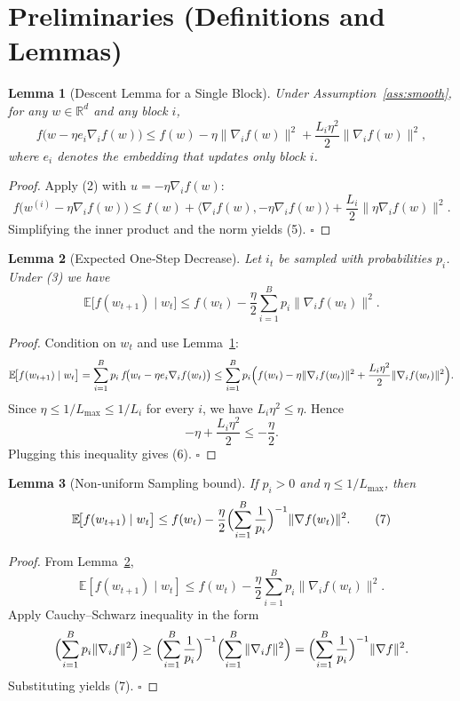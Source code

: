 \documentclass{article}
\newtheorem{lemma}{Lemma}
\begin{document}
\section*{Preliminaries (Definitions and Lemmas)}
\begin{lemma}[Descent Lemma for a Single Block]\label{lem:descent}
Under Assumption~\ref{ass:smooth}, for any $w\in\mathbb{R}^d$ and any block $i$,
\[
f\!\bigl(w - \eta e_i \nabla_i f(w)\bigr)
\le
f(w) - \eta \|\nabla_i f(w)\|^2 + \frac{L_i\eta^{2}}{2}\|\nabla_i f(w)\|^2,
\tag{5}
\]
where $e_i$ denotes the embedding that updates only block $i$.
\end{lemma}
\begin{proof}
Apply (2) with $u=-\eta\nabla_i f(w)$:
\[
f\bigl(w^{(i)}-\eta\nabla_i f(w)\bigr)
\le
f(w)+\langle \nabla_i f(w), -\eta\nabla_i f(w)\rangle
+\frac{L_i}{2}\|\eta\nabla_i f(w)\|^{2}.
\]
Simplifying the inner product and the norm yields (5). \hfill $\square$
\end{proof}

\begin{lemma}[Expected One‑Step Decrease]\label{lem:expdecrease}
Let $i_t$ be sampled with probabilities $p_i$. Under (3) we have
\[
\mathbb{E}\!\bigl[f(w_{t+1})\mid w_t\bigr]
\le
f(w_t)-\frac{\eta}{2}\sum_{i=1}^{B}p_i\|\nabla_i f(w_t)\|^{2}.
\tag{6}
\]
\end{lemma}
\begin{proof}
Condition on $w_t$ and use Lemma~\ref{lem:descent}:
\[
\mathbb{E}\!\bigl[f(w_{t+1})\mid w_t\bigr]
= \sum_{i=1}^{B}p_i\,f\!\bigl(w_t-\eta e_i\nabla_i f(w_t)\bigr)
\le
\sum_{i=1}^{B}p_i\Bigl(f(w_t)-\eta\|\nabla_i f(w_t)\|^{2}
+\frac{L_i\eta^{2}}{2}\|\nabla_i f(w_t)\|^{2}\Bigr).
\]
Since $\eta\le 1/L_{\max}\le 1/L_i$ for every $i$, we have $L_i\eta^{2}\le\eta$. Hence
\[
-\eta+\frac{L_i\eta^{2}}{2}\le -\frac{\eta}{2}.
\]
Plugging this inequality gives (6). \hfill $\square$
\end{proof}

\begin{lemma}[Non‑uniform Sampling bound]\label{lem:nonuniform}
If $p_i>0$ and $\eta\le 1/L_{\max}$, then
\[
\mathbb{E}\!\bigl[f(w_{t+1})\mid w_t\bigr]
\le
f(w_t)-\frac{\eta}{2}\Bigl(\sum_{i=1}^{B}\frac{1}{p_i}\Bigr)^{-1}\|\nabla f(w_t)\|^{2}.
\tag{7}
\]
\end{lemma}
\begin{proof}
From Lemma~\ref{lem:expdecrease},
\[
\mathbb{E}[f(w_{t+1})\mid w_t]
\le f(w_t)-\frac{\eta}{2}\sum_{i=1}^{B}p_i\|\nabla_i f(w_t)\|^{2}.
\]
Apply Cauchy–Schwarz inequality in the form
\[
\Bigl(\sum_{i=1}^{B}p_i\|\nabla_i f\|^{2}\Bigr)
\ge
\Bigl(\sum_{i=1}^{B}\frac{1}{p_i}\Bigr)^{-1}
\Bigl(\sum_{i=1}^{B}\|\nabla_i f\|^{2}\Bigr)
= \Bigl(\sum_{i=1}^{B}\frac{1}{p_i}\Bigr)^{-1}\|\nabla f\|^{2}.
\]
Substituting yields (7). \hfill $\square$
\end{proof}
\end{document}

